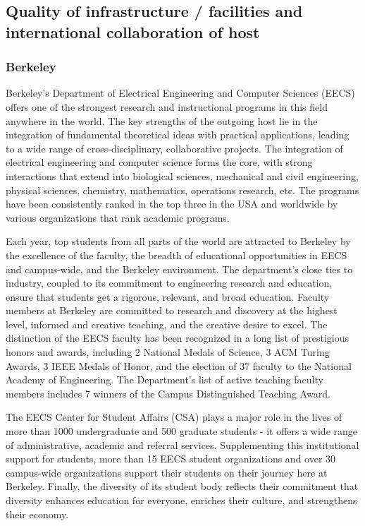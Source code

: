 \subsection{Quality of infrastructure / facilities and international collaboration of host} 
\subsubsection{Berkeley}
Berkeley's Department of  Electrical Engineering and Computer Sciences
(EECS) offers one of the strongest research and instructional programs
in this field anywhere in the world. The key strengths of the outgoing
host  lie in  the integration  of fundamental  theoretical  ideas with
practical applications, leading to a wide range of cross-disciplinary,
collaborative projects. The  integration of electrical engineering and
computer science forms the  core, with strong interactions that extend
into biological  sciences, mechanical and  civil engineering, physical
sciences,  chemistry,  mathematics,   operations  research,  etc.  The
programs have been consistently ranked in the top three in the USA and
worldwide by various organizations that rank academic programs.

Each year, top  students from all parts of the  world are attracted to
Berkeley by the excellence of  the faculty, the breadth of educational
opportunities   in   EECS    and   campus-wide,   and   the   Berkeley
environment. The  department's close ties to industry,  coupled to its
commitment to engineering research and education, ensure that students
get  a rigorous,  relevant, and  broad education.  Faculty  members at
Berkeley are committed to research and discovery at the highest level,
informed and creative teaching, and  the creative desire to excel. The
distinction of the EECS faculty has  been recognized in a long list of
prestigious honors and awards, including 2 National Medals of Science,
3 ACM  Turing Awards, 3 IEEE Medals  of Honor, and the  election of 37
faculty to the National  Academy of Engineering. The Department's list
of active  teaching faculty members  includes 7 winners of  the Campus
Distinguished Teaching Award.

The EECS  Center for Student Affairs  (CSA) plays a major  role in the
lives of more  than 1000 undergraduate and 500  graduate students - it
offers  a   wide  range  of  administrative,   academic  and  referral
services. Supplementing this  institutional support for students, more
than   15  EECS   student  organizations   and  over   30  campus-wide
organizations  support   their  students   on  their  journey   here  at
Berkeley.  Finally, the  diversity of  its student  body  reflects their
commitment  that diversity enhances  education for  everyone, enriches
their culture, and strengthens their economy.

